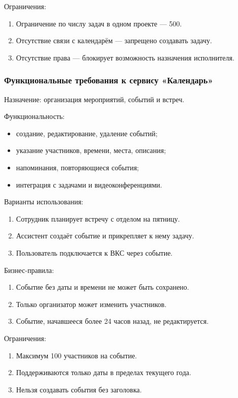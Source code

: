 Ограничения:
\begin{enumerate}
  \item Ограничение по числу задач в одном проекте — 500.
  \item Отсутствие связи с календарём — запрещено создавать задачу.
  \item Отсутствие права — блокирует возможность назначения исполнителя.
\end{enumerate}

\subsubsection{Функциональные требования к сервису «Календарь»}

Назначение: организация мероприятий, событий и встреч.

Функциональность:
\begin{itemize}
  \item создание, редактирование, удаление событий;
  \item указание участников, времени, места, описания;
  \item напоминания, повторяющиеся события;
  \item интеграция с задачами и видеоконференциями.
\end{itemize}

Варианты использования:
\begin{enumerate}
  \item Сотрудник планирует встречу с отделом на пятницу.
  \item Ассистент создаёт событие и прикрепляет к нему задачу.
  \item Пользователь подключается к ВКС через событие.
\end{enumerate}

Бизнес-правила:
\begin{enumerate}
  \item Событие без даты и времени не может быть сохранено.
  \item Только организатор может изменить участников.
  \item Событие, начавшееся более 24 часов назад, не редактируется.
\end{enumerate}

Ограничения:
\begin{enumerate}
  \item Максимум 100 участников на событие.
  \item Поддерживаются только даты в пределах текущего года.
  \item Нельзя создавать события без заголовка.
\end{enumerate}

